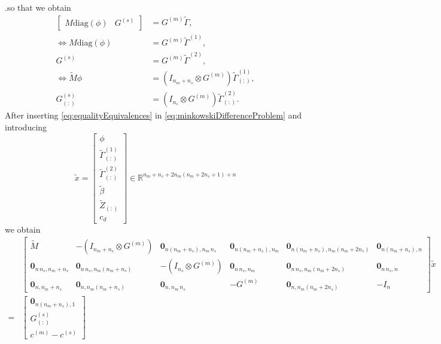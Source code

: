 \documentclass[10pt,a4paper]{article}
\renewcommand{\^}[1]{^{(#1)}}
\begin{document}
.so that we obtain
\begin{equation} \label{eq:equalityEquivalences}
\begin{split}
 \begin{bmatrix} M \mathrm{diag}(\phi) & G\^s \end{bmatrix} &= G\^m \tilde{\Gamma}, \\
 \Leftrightarrow M \mathrm{diag}(\phi)  &= G\^m \tilde{\Gamma}\^1, \\
 G\^s &= G\^m \tilde{\Gamma}\^2, \\
 \Leftrightarrow \tilde{M} \phi  &= (I_{n_m + n_s} \otimes G\^m) \tilde{\Gamma}\^1_{(:)}, \\
 G\^s_{(:)} &= (I_{n_s} \otimes G\^m) \tilde{\Gamma}\^2_{(:)}.
\end{split}
\end{equation}
After inserting \eqref{eq:equalityEquivalences} in \eqref{eq:minkowskiDifferenceProblem} and introducing 
\begin{equation*}
 \tilde{x}= \begin{bmatrix}
             \phi \\
             \tilde{\Gamma}\^1_{(:)} \\
             \tilde{\Gamma}\^2_{(:)} \\
             \tilde{\beta} \\
             \tilde{Z}_{(:)} \\
             c_d
            \end{bmatrix} \in \mathbb{R}^{n_m + n_s + 2n_m(n_m+2n_s+1) + n}
\end{equation*}
we obtain
\begin{equation*}
 \begin{split}
  &\begin{bmatrix} \tilde{M} & -  (I_{n_m + n_s} \otimes G\^m) & \mathbf{0}_{n(n_m + n_s),n_m \, n_s} & \mathbf{0}_{n(n_m + n_s),n_m} & \mathbf{0}_{n(n_m + n_s),n_m(n_m + 2n_s)} & \mathbf{0}_{n(n_m + n_s),n} \\
  \mathbf{0}_{n \, n_s,n_m+n_s} & \mathbf{0}_{n\, n_s,n_m(n_m + n_s)} & -(I_{n_s} \otimes G\^m) & \mathbf{0}_{n \, n_s,n_m} & \mathbf{0}_{n \, n_s,n_m(n_m + 2n_s)} & \mathbf{0}_{n \, n_s,n} \\
  \mathbf{0}_{n,n_m + n_s} & \mathbf{0}_{n,n_m(n_m + n_s)} & \mathbf{0}_{n,n_m \, n_s} & -G\^m & \mathbf{0}_{n,n_m(n_m + 2n_s)} & -I_n 
  \end{bmatrix} \tilde{x} \\
  =&
  \begin{bmatrix}
   \mathbf{0}_{n(n_m + n_s),1} \\
   G\^s_{(:)} \\
   c\^m - c\^s
  \end{bmatrix}
 \end{split}
\end{equation*}
\end{document}
